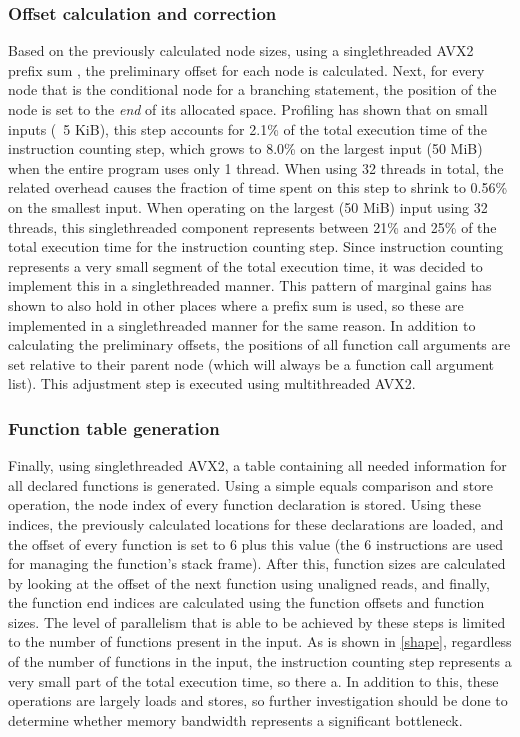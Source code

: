 \documentclass[11pt,dvipsnames]{article}
\begin{document}
\subsubsection*{Offset calculation and correction}
Based on the previously calculated node sizes, using a singlethreaded AVX2 prefix sum \cite{Zhang2020ParallelPS}, the preliminary offset for each node is calculated. Next, for every node that is the conditional node for a branching statement, the position of the node is set to the \textit{end} of its allocated space. Profiling has shown that on small inputs (~5 KiB), this step accounts for 2.1\% of the total execution time of the instruction counting step, which grows to 8.0\% on the largest input (50 MiB) when the entire program uses only 1 thread. When using 32 threads in total, the related overhead causes the fraction of time spent on this step to shrink to 0.56\% on the smallest input. When operating on the largest (50 MiB) input using 32 threads, this singlethreaded component represents between 21\% and 25\% of the total execution time for the instruction counting step. Since instruction counting represents a very small segment of the total execution time, it was decided to implement this in a singlethreaded manner. This pattern of marginal gains has shown to also hold in other places where a prefix sum is used, so these are implemented in a singlethreaded manner for the same reason. In addition to calculating the preliminary offsets, the positions of all function call arguments are set relative to their parent node (which will always be a function call argument list). This adjustment step is executed using multithreaded AVX2.

\subsubsection*{Function table generation}
Finally, using singlethreaded AVX2, a table containing all needed information for all declared functions is generated. Using a simple equals comparison and store operation, the node index of every function declaration is stored. Using these indices, the previously calculated locations for these declarations are loaded, and the offset of every function is set to 6 plus this value (the 6 instructions are used for managing the function's stack frame). After this, function sizes are calculated by looking at the offset of the next function using unaligned reads, and finally, the function end indices are calculated using the function offsets and function sizes. The level of parallelism that is able to be achieved by these steps is limited to the number of functions present in the input. As is shown in \autoref{shape}, regardless of the number of functions in the input, the instruction counting step represents a very small part of the total execution time, so there a. In addition to this, these operations are largely loads and stores, so further investigation should be done to determine whether memory bandwidth represents a significant bottleneck.
\end{document}
